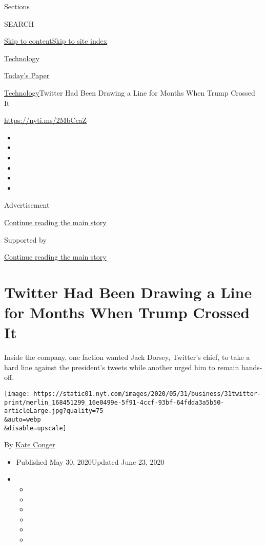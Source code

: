 Sections

SEARCH

\protect\hyperlink{site-content}{Skip to
content}\protect\hyperlink{site-index}{Skip to site index}

\href{https://www.nytimes.com/section/technology}{Technology}

\href{https://myaccount.nytimes.com/auth/login?response_type=cookie\&client_id=vi}{}

\href{https://www.nytimes.com/section/todayspaper}{Today's Paper}

\href{/section/technology}{Technology}\textbar{}Twitter Had Been Drawing
a Line for Months When Trump Crossed It

\href{https://nyti.ms/2MbCcaZ}{https://nyti.ms/2MbCcaZ}

\begin{itemize}
\item
\item
\item
\item
\item
\item
\end{itemize}

Advertisement

\protect\hyperlink{after-top}{Continue reading the main story}

Supported by

\protect\hyperlink{after-sponsor}{Continue reading the main story}

\hypertarget{twitter-had-been-drawing-a-line-for-months-when-trump-crossed-it}{%
\section{Twitter Had Been Drawing a Line for Months When Trump Crossed
It}\label{twitter-had-been-drawing-a-line-for-months-when-trump-crossed-it}}

Inside the company, one faction wanted Jack Dorsey, Twitter's chief, to
take a hard line against the president's tweets while another urged him
to remain hands-off.

\texttt{[image: https://static01.nyt.com/images/2020/05/31/business/31twitter-print/merlin\_168451299\_16e0499e-5f91-4ccf-93bf-64fdda3a5b50-articleLarge.jpg?quality=75\\\&auto=webp\\\&disable=upscale]}

By \href{https://www.nytimes.com/by/kate-conger}{Kate Conger}

\begin{itemize}
\item
  Published May 30, 2020Updated June 23, 2020
\item
  \begin{itemize}
  \item
  \item
  \item
  \item
  \item
  \item
  \end{itemize}
\end{itemize}

